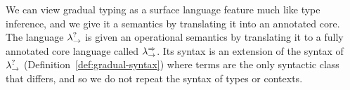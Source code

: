 We can view gradual typing as a surface language feature much like
type inference, and we give it a semantics by translating it into an
annotated core. The language $\lambda^?_\to$ is given an operational
semantics by translating it to a fully annotated core language called
$\lambda^{\Rightarrow}_\to$.  Its syntax is an extension of the syntax of $\lambda^?_\to$
(Definition~\ref{def:gradual-syntax}) where terms are the only
syntactic class that differs, and so we do not repeat the syntax of
types or contexts.
\renewcommand{\GSiekdruleCXXvarName}[0]{\text{var}}
\renewcommand{\GSiekdruleCXXunitName}[0]{\text{unit}}
\renewcommand{\GSiekdruleCXXzeroName}[0]{\text{zero}}
\renewcommand{\GSiekdruleCXXsuccName}[0]{\text{succ}}
\renewcommand{\GSiekdruleCXXpairName}[0]{\times}
\renewcommand{\GSiekdruleCXXlamName}[0]{\to}
\renewcommand{\GSiekdruleCXXsndName}[0]{\times_{e_2}}
\renewcommand{\GSiekdruleCXXfstName}[0]{\times_{e_1}}
\renewcommand{\GSiekdruleCXXappName}[0]{\to_e}
\renewcommand{\GSiekdruleCXXcastName}[0]{\text{cast}}
\renewcommand{\GSiekdrulerdAXXvaluesName}{\text{values}}
\renewcommand{\GSiekdrulerdAXXcastIdName}{\text{id-atom}}
\renewcommand{\GSiekdrulerdAXXcastUName}{\text{id-U}}
\renewcommand{\GSiekdrulerdAXXsucceedName}{\text{succeed}}
\renewcommand{\GSiekdrulerdAXXcastArrowName}{\text{arrow}}
\renewcommand{\GSiekdrulerdAXXcastGroundName}{\text{expand}_1}
\renewcommand{\GSiekdrulerdAXXcastExpandName}{\text{expand}_2}
\renewcommand{\GSiekdrulerdAXXbetaName}{}
\renewcommand{\GSiekdrulerdAXXappOneName}{}
\renewcommand{\GSiekdrulerdAXXappTwoName}{}
\renewcommand{\GSiekdrulerdAXXfstName}{}
\renewcommand{\GSiekdrulerdAXXsndName}{}
\renewcommand{\GSiekdrulerdAXXpairOneName}{}
\renewcommand{\GSiekdrulerdAXXpairTwoName}{}
